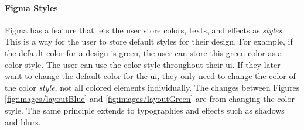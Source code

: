 \paragraph{Figma Styles}%
\label{ssub:Styles}

Figma has a feature that lets the user store colors, texts, and effects as \textit{styles}. This is a way for the user to store default styles for their design.  For example, if the default color for a design is green, the user can store this green color as a color style. The user can use the color style throughout their \acrfull{ui}. If they later want to change the default color for the \acrshort{ui}, they only need to change the color of the color \textit{style}, not all colored elements individually. The changes between Figures \ref{fig:images/layoutBlue} and \ref{fig:images/layoutGreen} are from changing the color style. The same principle extends to typographies and effects such as shadows and blurs. 

